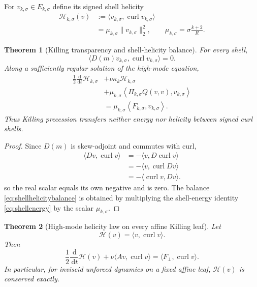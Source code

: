 \documentclass[
 aps,
 prd,
 reprint,
 amsmath,
 amssymb,
 nofootinbib,
 superscriptaddress
]{revtex4-2}
\newtheorem{theorem}{Theorem}[section]
\theoremstyle{definition}
\theoremstyle{remark}
\newcommand{\curl}{\operatorname{curl}}
\newcommand{\dd}{\,\mathrm d}
\begin{document}
For $v_{k,\sigma}\in E_{k,\sigma}$ define its signed shell helicity
\begin{equation}
\begin{aligned}
 \mathscr H_{k,\sigma}(v)
 &:=
 \langle v_{k,\sigma},\curl v_{k,\sigma}\rangle\\
 &=
 \mu_{k,\sigma}\|v_{k,\sigma}\|_2^2,
 \qquad
 \mu_{k,\sigma}=\sigma\frac{k+2}{R}.
\end{aligned}
\label{eq:shellhelicity}
\end{equation}

\begin{theorem}[Killing transparency and shell-helicity balance]
\label{thm:shellhelicity}
For every shell,
\begin{equation}
 \boxed{
 \langle D(m)v_{k,\sigma},
         \curl v_{k,\sigma}\rangle=0.
 }
 \label{eq:Dhelicityzero}
\end{equation}
Along a sufficiently regular solution of the high-mode equation,
\begin{equation}
\boxed{
\begin{aligned}
 \frac12\frac{\dd}{\dd t}\mathscr H_{k,\sigma}
 &+
 \nu\kappa_k\mathscr H_{k,\sigma}\\
 &+
 \mu_{k,\sigma}
 \left\langle
   \Pi_{k,\sigma}Q(v,v),v_{k,\sigma}
 \right\rangle\\
 &=
 \mu_{k,\sigma}
 \left\langle
   F_{k,\sigma},v_{k,\sigma}
 \right\rangle .
\end{aligned}}
\label{eq:shellhelicitybalance}
\end{equation}
Thus Killing precession transfers neither energy nor helicity between signed
curl shells.
\end{theorem}

\begin{proof}
Since $D(m)$ is skew-adjoint and commutes with curl,
\[
\begin{aligned}
 \langle Dv,\curl v\rangle
 &=
 -\langle v,D\curl v\rangle\\
 &=
 -\langle v,\curl Dv\rangle\\
 &=
 -\langle\curl v,Dv\rangle.
\end{aligned}
\]
so the real scalar equals its own negative and is zero.  The balance
\eqref{eq:shellhelicitybalance} is obtained by multiplying the shell-energy
identity \eqref{eq:shellenergy} by the scalar $\mu_{k,\sigma}$.
\end{proof}

\begin{theorem}[High-mode helicity law on every affine Killing leaf]
\label{thm:totalhighhelicity}
Let
\[
 \mathscr H(v)=\langle v,\curl v\rangle.
\]
Then
\begin{equation}
 \boxed{
 \frac12\frac{\dd}{\dd t}\mathscr H(v)
 +
 \nu\langle Av,\curl v\rangle
 =
 \langle F_\perp,\curl v\rangle.
 }
 \label{eq:totalhighhelicity}
\end{equation}
In particular, for inviscid unforced dynamics on a fixed affine leaf,
$\mathscr H(v)$ is conserved exactly.
\end{theorem}
\end{document}
